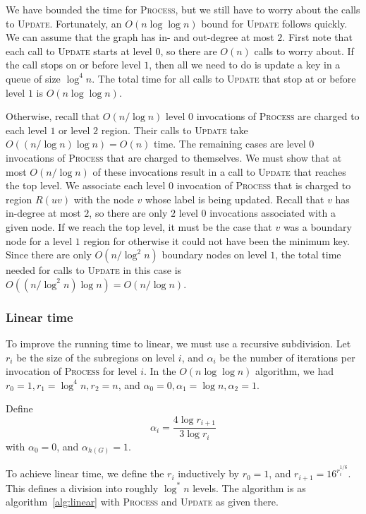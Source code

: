 \documentclass[12pt]{article}
\begin{document}
We have bounded the time for \textsc{Process}, but we still have to worry about the calls to \textsc{Update}. Fortunately, an $O(n \log \log n)$ bound for \textsc{Update} follows quickly.  We can assume that the graph has in- and out-degree at most $2$. First note that each call to \textsc{Update} starts at level $0$, so there are $O(n)$ calls to worry about. If the call stops on or before level $1$, then all we need to do is update a key in a queue of size $\log^4 n$. The total time for all calls to \textsc{Update} that stop at or before level $1$ is $O(n \log \log n)$.

Otherwise, recall that $O(n/\log n)$ level $0$ invocations of \textsc{Process} are charged to each level $1$ or level $2$ region. Their calls to \textsc{Update} take $O((n/\log n) \log n) = O(n)$ time. The remaining cases are level $0$ invocations of \textsc{Process} that are charged to themselves. We must show that at most $O(n/\log n)$ of these invocations result in a call to \textsc{Update} that reaches the top level. We associate each level $0$ invocation of \textsc{Process} that is charged to region $R(uv)$ with the node $v$ whose label is being updated. Recall that $v$ has in-degree at most $2$, so there are only $2$ level $0$ invocations associated with a given node. If we reach the top level, it must be the case that $v$ was a boundary node for a level $1$ region for otherwise it could not have been the minimum key. Since there are only $O(n/\log^2 n)$ boundary nodes on level $1$, the total time needed for calls to \textsc{Update} in this case is $O((n/\log^2 n) \log n) = O(n/\log n)$.

\subsubsection{Linear time}
\label{sec:linear-time}

To improve the running time to linear, we must use a recursive subdivision. Let $r_i$ be the size of the subregions on level $i$, and $\alpha_i$ be the number of iterations per invocation of \textsc{Process} for level $i$. In the $O(n \log \log n)$ algorithm, we had $r_0 = 1, r_1 = \log^4 n, r_2 = n$, and $\alpha_0 = 0, \alpha_1 = \log n, \alpha_2 = 1$.

Define
\[
  \alpha_i = \frac{4\log r_{i+1}}{3 \log r_i}
\]
with $\alpha_0 = 0$, and $\alpha_{h(G)} = 1$.

To achieve linear time, we define the $r_i$ inductively by $r_0 = 1$, and $r_{i+1} = 16^{r_i^{1/6}}$. This defines a division into roughly $\log^{*} n$ levels. The algorithm is as algorithm~\ref{alg:linear} with \textsc{Process} and \textsc{Update} as given there.
\end{document}
